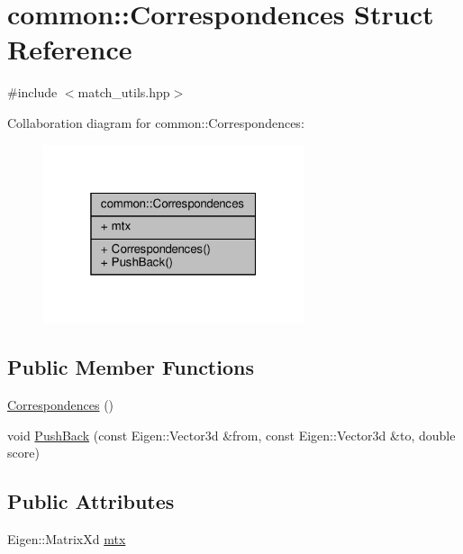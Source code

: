 \hypertarget{structcommon_1_1Correspondences}{}\section{common\+:\+:Correspondences Struct Reference}
\label{structcommon_1_1Correspondences}


{\ttfamily \#include $<$match\+\_\+utils.\+hpp$>$}



Collaboration diagram for common\+:\+:Correspondences\+:\nopagebreak
\begin{figure}[H]
\begin{center}
\leavevmode
\includegraphics[width=217pt]{d5/d1a/structcommon_1_1Correspondences__coll__graph}
\end{center}
\end{figure}
\subsection*{Public Member Functions}
\begin{DoxyCompactItemize}
\item 
\hyperlink{structcommon_1_1Correspondences_ae1eb166beacea5976106c5479aeb86ad}{Correspondences} ()
\item 
void \hyperlink{structcommon_1_1Correspondences_a50974cb762f1621d1bd5cd9b4ee1eb80}{Push\+Back} (const Eigen\+::\+Vector3d \&from, const Eigen\+::\+Vector3d \&to, double score)
\end{DoxyCompactItemize}
\subsection*{Public Attributes}
\begin{DoxyCompactItemize}
\item 
Eigen\+::\+Matrix\+Xd \hyperlink{structcommon_1_1Correspondences_ab8841b71f2e02544b010ae5e2bc5308c}{mtx}
\end{DoxyCompactItemize}



